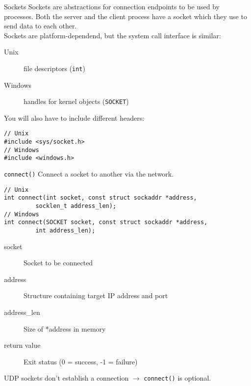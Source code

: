 \begin{frame}[fragile]{Sockets}
    Sockets are abstractions for connection endpoints to be used by processes.
    Both the server and the client process have a socket which they use to
    send data to each other.\\
    \bigskip
    Sockets are platform-dependend, but the system call interface is similar:
    \begin{description}
        \item[Unix] file descriptors (\lstinline{int})
        \item[Windows] handles for kernel objects
            (\lstinline[morekeywords={*,SOCKET}]{SOCKET})
    \end{description}
    \bigskip
    You will also have to include different headers:
    \begin{lstlisting}[numbers=none]
// Unix
#include <sys/socket.h>
// Windows
#include <windows.h>
\end{lstlisting}
\end{frame}


\begin{frame}[fragile]{\texttt{connect()}}
    Connect a socket to another via the network.
    \begin{lstlisting}[numbers=none,morekeywords={*,SOCKET,socklen_t,sockaddr}]
// Unix
int connect(int socket, const struct sockaddr *address,
         socklen_t address_len);
// Windows
int connect(SOCKET socket, const struct sockaddr *address,
         int address_len);
\end{lstlisting}
    \begin{description}
        \item[socket] Socket to be connected
        \item[address] Structure containing target IP address and port
        \item[address\_len] Size of *address in memory
        \item[return value] Exit status (0 = success, -1 = failure)
    \end{description}
    \bigskip
    UDP sockets don't establish a connection $\rightarrow$ \texttt{connect()} is
    optional.
\end{frame}

